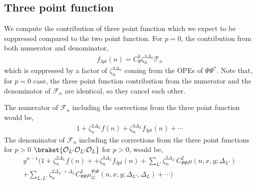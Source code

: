 \documentclass[11pt]{article}
\newcommand{\mO}{\mathcal{O}}
\newcommand{\nn}{\nonumber}
\newcommand{\lb}{\left(}
\newcommand{\rb}{\right)}
\begin{document}
\subsection{Three point function}
We compute the contribution of three point function which we expect to be suppressed compared to the two point function. 
For $p=0$, the contribution from both numerator and denominator,
\begin{align}
    f_{3pt}(n) = C_\Psi^3 \zeta_n^{3\Delta_L} \mathcal{T}_n 
\end{align}
which is suppressed by a factor of $\zeta_n^{3\Delta_L}$ coming from the OPEs of $\Psi \Psi^*$.
Note that, for $p=0$ case, the three point function contribution from the numerator and the denominator of $\mathcal{F}_n$ are identical, so they cancel each other.

The numerator of $\mathcal{F}_n$ including the corrections from the three point function would be,
\begin{align}
    1 + \zeta_n^{2\Delta_L}f(n) + \zeta_n^{3\Delta_L}f_{3pt}(n) + \cdots
\end{align}
The denominator of $\mathcal{F}_n$ including the corrections from the three point functions for $p> 0$ $\braket{\mO_{L'} \mO_{L'}\mO_L}$ for $p>0$, would be,
\begin{align}
y^{n-1}\Bigg( 1+ \zeta_n^{2\Delta_L} f(n)  + + \zeta_n^{3\Delta_L}f_{3pt}(n) + \sum_{L'} \zeta_n^{2\Delta_{L'} } C_{\Psi \Phi}^2 \mu(n,x,y;\Delta_{L'}) \nn\\
+ \sum_{L,L'}\zeta_n^{2\Delta_{L'} + \Delta_L}C^2_{\Psi\Phi} \mu_G^{\Psi|\Phi}(n,x,y;\Delta_{L'},\Delta_L)+\cdots\Bigg)
\end{align}
\end{document}
